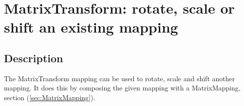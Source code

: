 \section{MatrixTransform: rotate, scale or shift an existing mapping}

\subsection{Description}

The {\ff MatrixTransform} mapping can be used to rotate, scale and
shift another mapping. It does this by composing 
the given mapping with a {\ff MatrixMapping}, section (\ref{sec:MatrixMapping}). 

